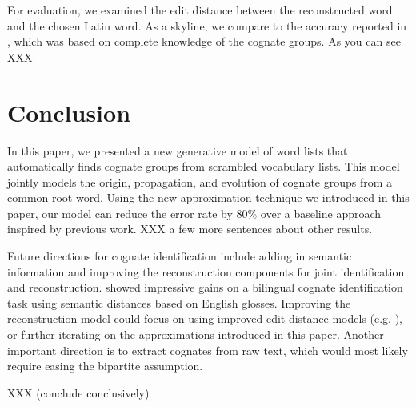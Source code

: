 \documentclass[11pt,a4paper]{article}
\begin{document}
For evaluation, we examined the edit distance between the reconstructed
word and the chosen Latin word. As a skyline, we compare to the
accuracy reported in , which was based
on complete knowledge of the cognate groups. As you can see XXX

\section{Conclusion}

In this paper, we presented a new generative model of word lists
that automatically finds cognate groups from scrambled vocabulary
lists. This model jointly models the origin, propagation, and
evolution of cognate groups from a common root word. Using the new
approximation technique we introduced in this paper, our model can
reduce the error rate by 80\% over a baseline approach inspired by
previous work. XXX a few more sentences about other results.

Future directions for cognate identification include adding in
semantic information and improving the reconstruction components
for joint identification and reconstruction. 
showed impressive gains on a bilingual cognate identification task
using semantic distances based on English glosses.  Improving the
reconstruction model could focus on using improved edit distance
models (e.g. ), or further iterating
on the approximations introduced in this paper.  Another important
direction is to extract cognates from raw text, which would most
likely require easing the bipartite assumption.

XXX (conclude conclusively)



\end{document}
